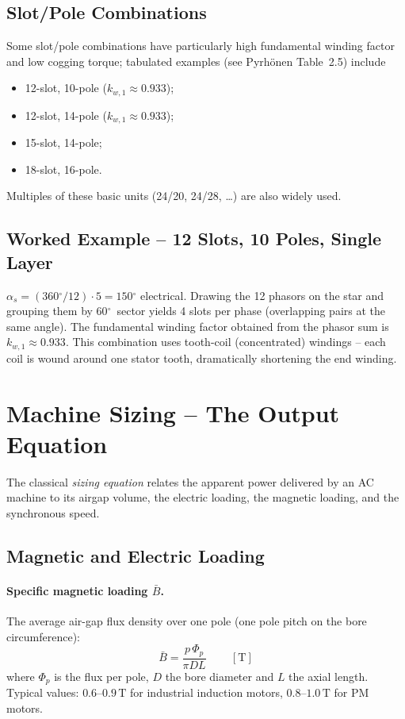 \documentclass[12pt,a4paper]{article}
\newcommand{\unit}[1]{\ensuremath{\,\mathrm{#1}}}
\newcommand{\degree}{\ensuremath{^{\circ}}}
\begin{document}
\subsection{Slot/Pole Combinations}

Some slot/pole combinations have particularly high fundamental winding
factor and low cogging torque; tabulated examples (see Pyrh\"onen
Table~2.5) include
\begin{itemize}[noitemsep]
  \item 12-slot, 10-pole ($k_{w,1}\approx 0.933$);
  \item 12-slot, 14-pole ($k_{w,1}\approx 0.933$);
  \item 15-slot, 14-pole;
  \item 18-slot, 16-pole.
\end{itemize}
Multiples of these basic units (24/20, 24/28, \ldots) are also widely
used.

\subsection{Worked Example -- 12 Slots, 10 Poles, Single Layer}

$\alpha_s = (360\degree/12)\cdot 5 = 150\degree$ electrical.
Drawing the 12 phasors on the star and grouping them by 60\degree\
sector yields 4 slots per phase (overlapping pairs at the same
angle). The fundamental winding factor obtained from the phasor sum
is $k_{w,1}\approx 0.933$. This combination uses tooth-coil (concentrated)
windings -- each coil is wound around one stator tooth, dramatically
shortening the end winding.

\section{Machine Sizing -- The Output Equation}
\label{sec:sizing}

The classical \emph{sizing equation} relates the apparent power
delivered by an AC machine to its airgap volume, the electric loading,
the magnetic loading, and the synchronous speed.

\subsection{Magnetic and Electric Loading}

\paragraph{Specific magnetic loading $\bar B$.}
The average air-gap flux density over one pole (one pole pitch on the
bore circumference):
\begin{equation}
  \bar{B} = \frac{p\,\Phi_p}{\pi D L}
  \qquad\unit{[T]}
\end{equation}
where $\Phi_p$ is the flux per pole, $D$ the bore diameter and $L$ the
axial length. Typical values: $0.6$--$0.9\unit{T}$ for industrial
induction motors, $0.8$--$1.0\unit{T}$ for PM motors.
\end{document}
